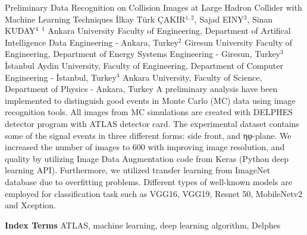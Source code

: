 
    \begin{abstract_online}{Preliminary Data Recognition on Collision Images at Large Hadron Collider with Machine Learning Techniques}{%
        İlkay Türk ÇAKIR$^{1,2}$, Sajad EINY$^{3}$, Sinan KUDAY$^{4}$}{%
        }{%
        $^1$ Ankara University Faculty of Engineering, Department of Artifical Intelligence Data Engineering - Ankara, Turkey\newline{}$^2$ Giresun University Faculty of Engineering, Department of Energy Systems Engineering - Giresun, Turkey\newline{}$^3$ İstanbul Aydin University, Faculty of Engineering, Department of Computer Engineering - İstanbul, Turkey\newline{}$^4$ Ankara University, Faculty of Science, Department of Physics - Ankara, Turkey}
    A preliminary analysis have been implemented to distinguish good events in Monte Carlo (MC) data using image recognition tools. All images from MC simulations are created with DELPHES detector program with ATLAS detector card. The experimental dataset contains some of the signal events in three different forms: side front, and ηφ-plane. We increased the number of images to 600 with improving image resolution, and quality by utilizing Image Data Augmentation code from Keras (Python deep learning API). Furthermore, we utilized transfer learning from ImageNet database due to overfitting problems. Different types of well-known models are employed for classification task such as VGG16, VGG19, Resnet 50, MobileNetv2 and Xception.  
    
            \textbf{Index Terms} \newline{}ATLAS, machine learning, deep learning algorithm, Delphes
    \end{abstract_online}
    